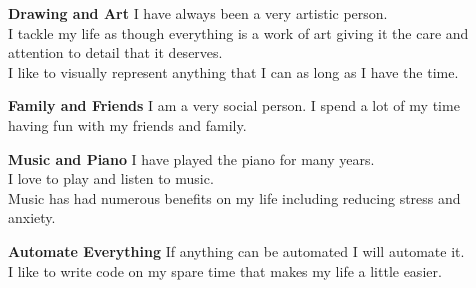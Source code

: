 
\begin{cvparagraph}

\begin{description}
  \item[] \textbf{Drawing and Art} \newline
  I have always been a very artistic person. \\
  I tackle my life as though everything is a work of art giving it the care and attention to detail that it deserves. \\
  I like to visually represent anything that I can as long as I have the time.
  \item[] \textbf{Family and Friends} \newline
  I am a very social person.  I spend a lot of my time having fun with my friends and family.
  \item[] \textbf{Music and Piano} \newline
  I have played the piano for many years. \\
  I love to play and listen to music. \\
  Music has had numerous benefits on my life including reducing stress and anxiety.
  \item[] \textbf{Automate Everything} \newline
  If anything can be automated I will automate it. \\
  I like to write code on my spare time that makes my life a little easier.
\end{description}
\end{cvparagraph}
